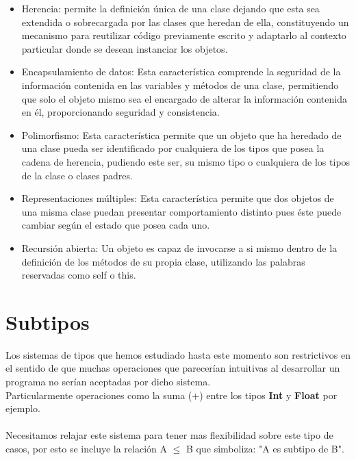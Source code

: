 \begin{itemize}
    \item Herencia:
	 permite la definición única de una clase dejando que esta sea extendida o sobrecargada por las clases que heredan de ella, constituyendo un mecanismo para reutilizar código previamente escrito y adaptarlo al contexto particular donde se desean instanciar los objetos.\\

    \item Encapsulamiento de datos: Esta característica comprende la seguridad de la información contenida en las variables y métodos de una clase, permitiendo que solo el objeto mismo sea el encargado de alterar la información contenida en él, proporcionando seguridad y consistencia.\\

    \item  Polimorfismo: Esta característica permite que un objeto que ha heredado de una clase pueda ser identificado por cualquiera de los tipos que posea la cadena de herencia, pudiendo este ser, su mismo tipo o cualquiera de los tipos de la clase o clases padres.\\

    \item  Representaciones múltiples: Esta característica permite que dos objetos de una misma clase puedan presentar comportamiento distinto pues éste puede cambiar según el estado que posea cada uno.\\

    \item Recursión abierta: Un objeto es capaz de invocarse a si mismo dentro de la definición de los métodos de su propia clase, utilizando las palabras reservadas como \textsf{self} o \textsf{this}.
\end{itemize}


\section{Subtipos}

Los sistemas de tipos que hemos estudiado hasta este momento son restrictivos en el sentido de que muchas operaciones que parecerían intuitivas al desarrollar un programa no serían aceptadas por dicho sistema.\\
Particularmente operaciones como la suma (+) entre los tipos \textbf{Int} y \textbf{Float} por ejemplo.\\\\
Necesitamos relajar este sistema para tener mas flexibilidad sobre este tipo de casos, por esto se incluye la relación A $\leq$ B que simboliza: "A es subtipo de B".

